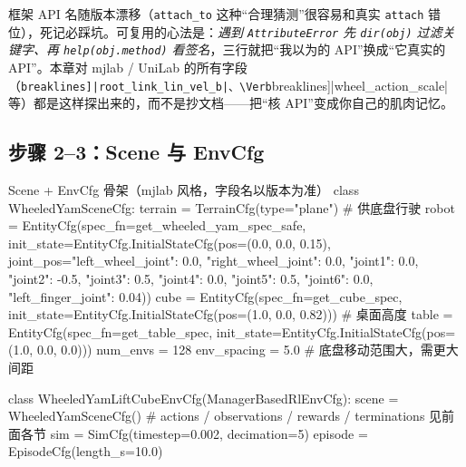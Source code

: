 \begin{insight}\label{ins:rlmc-wh-probe}
框架 API 名随版本漂移（\verb|attach_to| 这种“合理猜测”很容易和真实 \verb|attach| 错位），死记必踩坑。可复用的心法是：\emph{遇到 \texttt{AttributeError} 先 \texttt{dir(obj)} 过滤关键字、再 \texttt{help(obj.\allowbreak method)} 看签名}，三行就把“我以为的 API”换成“它真实的 API”。本章对 mjlab / UniLab 的所有字段（\Verb[breaklines]|root_link_lin_vel_b|、\Verb[breaklines]|wheel_action_scale| 等）都是这样探出来的，而不是抄文档——把“核 API”变成你自己的肌肉记忆。
\end{insight}


\subsection{步骤 2--3：Scene 与 EnvCfg}
\label{sec:rlmc-wh-scene}

\begin{codebox}[Python]{Scene + EnvCfg 骨架（mjlab 风格，字段名以版本为准）}
class WheeledYamSceneCfg:
    terrain = TerrainCfg(type="plane")                 # 供底盘行驶
    robot = EntityCfg(spec_fn=get_wheeled_yam_spec_safe,
        init_state=EntityCfg.InitialStateCfg(pos=(0.0, 0.0, 0.15),
            joint_pos={"left_wheel_joint": 0.0, "right_wheel_joint": 0.0,
                       "joint1": 0.0, "joint2": -0.5, "joint3": 0.5,
                       "joint4": 0.0, "joint5": 0.5, "joint6": 0.0,
                       "left_finger_joint": 0.04}))
    cube  = EntityCfg(spec_fn=get_cube_spec,
        init_state=EntityCfg.InitialStateCfg(pos=(1.0, 0.0, 0.82)))   # 桌面高度
    table = EntityCfg(spec_fn=get_table_spec,
        init_state=EntityCfg.InitialStateCfg(pos=(1.0, 0.0, 0.0)))
    num_envs = 128
    env_spacing = 5.0   # 底盘移动范围大，需更大间距

class WheeledYamLiftCubeEnvCfg(ManagerBasedRlEnvCfg):
    scene = WheeledYamSceneCfg()
    # actions / observations / rewards / terminations 见前面各节
    sim = SimCfg(timestep=0.002, decimation=5)
    episode = EpisodeCfg(length_s=10.0)
\end{codebox}

